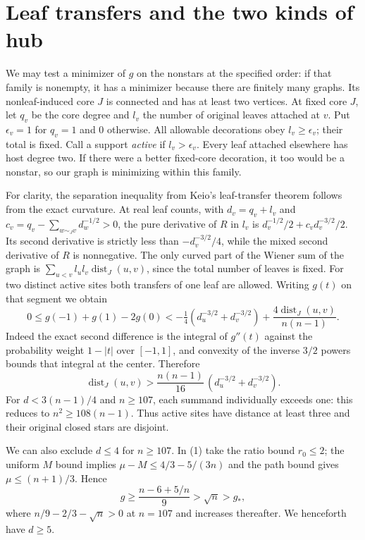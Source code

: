 \section{Leaf transfers and the two kinds of hub}
We may test a minimizer of $g$ on the nonstars at the specified order: if that family is nonempty, it has a minimizer because there are finitely many graphs. Its nonleaf-induced core $J$ is connected and has at least two vertices. At fixed core $J$, let $q_v$ be the core degree and $l_v$ the number of original leaves attached at $v$. Put $\epsilon_v=1$ for $q_v=1$ and $0$ otherwise. All allowable decorations obey $l_v\ge\epsilon_v$; their total is fixed. Call a support \emph{active} if $l_v>\epsilon_v$. Every leaf attached elsewhere has host degree two. If there were a better fixed-core decoration, it too would be a nonstar, so our graph is minimizing within this family.

For clarity, the separation inequality from Keio's leaf-transfer theorem \cite{keio} follows from the exact curvature. At real leaf counts, with $d_v=q_v+l_v$ and $c_v=q_v-\sum_{w\sim_Jv}d_w^{-1/2}>0$, the pure derivative of $R$ in $l_v$ is $d_v^{-1/2}/2+c_v d_v^{-3/2}/2$. Its second derivative is strictly less than $-d_v^{-3/2}/4$, while the mixed second derivative of $R$ is nonnegative. The only curved part of the Wiener sum of the graph is $\sum_{u<v}l_ul_v\operatorname{dist}_J(u,v)$, since the total number of leaves is fixed. For two distinct active sites both transfers of one leaf are allowed. Writing $g(t)$ on that segment we obtain
\[
0\le g(-1)+g(1)-2g(0)
< -\tfrac14(d_u^{-3/2}+d_v^{-3/2})
      +\frac{4\operatorname{dist}_J(u,v)}{n(n-1)}.
\]
Indeed the exact second difference is the integral of $g''(t)$ against the probability weight $1-|t|$ over $[-1,1]$, and convexity of the inverse $3/2$ powers bounds that integral at the center. Therefore
\[
\operatorname{dist}_J(u,v)>
\frac{n(n-1)}{16}\,(d_u^{-3/2}+d_v^{-3/2}).
\]
For $d<3(n-1)/4$ and $n\ge107$, each summand individually exceeds one: this reduces to $n^2\ge108(n-1)$. Thus active sites have distance at least three and their original closed stars are disjoint.

We can also exclude $d\le4$ for $n\ge107$. In (1) take the ratio bound $r_0\le2$; the uniform $M$ bound implies $\mu-M\le4/3-5/(3n)$ and the path bound gives $\mu\le(n+1)/3$. Hence
\[
g\ge\frac{n-6+5/n}{9}>\sqrt n>g_*,
\]
where $n/9-2/3-\sqrt n>0$ at $n=107$ and increases thereafter. We henceforth have $d\ge5$.

